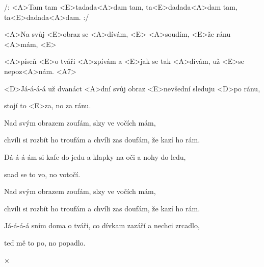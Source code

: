 

\zr
/: <A>Tam tam <E>tadada<A>dam tam, ta<E>dadada<A>dam tam, ta<E>dadada<A>dam. :/
\kr

\zs
<A>Na svůj <E>obraz se <A>dívám, <E> <A>soudím, <E>že ránu <A>mám, <E>

<A>píseň <E>o tváři <A>zpívám a <E>jak se tak <A>dívám, už <E>se nepoz<A>nám. <A7>

<D>Já-á-á-á už dvanáct <A>dní svůj obraz <E>nevšední sleduju <D>po ránu,

stojí to <E>za, no za ránu.
\ks

\zr\kr

\zs
Nad svým obrazem zoufám, slzy ve vočích mám,

chvíli si rozbít ho troufám a chvíli zas doufám, že kazí ho rám.

Dá-á-á-ám si kafe do jedu a klapky na oči a nohy do ledu,

snad se to vo, no votočí.
\ks

\zr\kr

\zs
Nad svým obrazem zoufám, slzy ve vočích mám,

chvíli si rozbít ho troufám a chvíli zas doufám, že kazí ho rám.

Já-á-á-á sním doma o tváři, co dívkam zazáří a nechci zrcadlo,

teď mě to po, no popadlo.
\ks

× \kr

\kp
